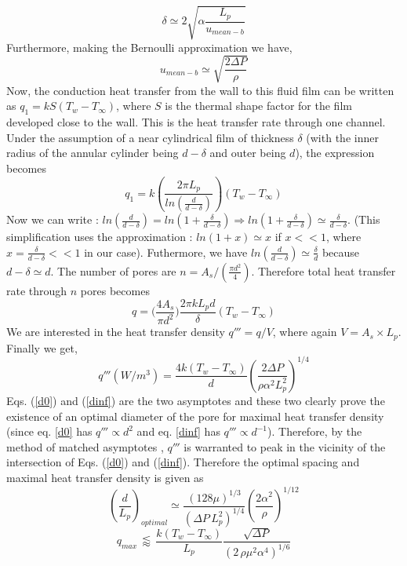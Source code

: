 \documentclass[twocolumn,10pt,cleanfoot]{ihmtc}
\begin{document}
\[\delta \simeq 2\sqrt{\alpha \frac{L_p}{u_{mean-b}}}\]
%
Furthermore, making the Bernoulli approximation we have,
\[u_{mean-b} \simeq \sqrt{\frac{2\Delta P}{\rho }}\]
%
Now, the conduction heat transfer from the wall to this fluid film can be written as $ q_1=k S (T_w-T_\infty)$, where $ S $ is the thermal shape factor for the film developed close to the wall. This is the heat transfer rate through one channel. Under the assumption of a near cylindrical film of thickness $\delta$ (with the inner radius of the annular cylinder being $d-\delta$ and outer being $d$), the expression becomes
\[q_1=k \left( \frac{2 \pi L_p}{ln\left(\frac{d}{d-\delta}\right)} \right) (T_w-T_\infty) \]
Now we can write : $ln(\frac{d}{d-\delta})=ln(1+\frac{\delta}{d-\delta}) \Rightarrow ln(1+\frac{\delta}{d-\delta}) \simeq \frac{\delta}{d-\delta}$. (This simplification uses the approximation : $ln(1+x) \simeq x$ if $x<<1$, where $x=\frac{\delta}{d-\delta}<<1$ in our case). Futhermore, we have $ln(\frac{d}{d-\delta})\simeq\frac{\delta}{d}$ because $d-\delta \simeq d$. The number of pores are $n=A_s/(\frac{\pi d^2}{4})$. Therefore total heat transfer rate through $n$ pores becomes
\[q=\biggl( \frac{4 A_s}{\pi d^2}\biggr) \frac{2 \pi k L_p d}{\delta}(T_w-T_\infty)\]
We are interested in the heat transfer density $q''' = q/V$, where again $V=A_s \times L_p$. Finally we get, 
%
\begin{equation}\label{dinf}
q'''(W/m^3)=\frac{4k (T_w-T_\infty)}{d}\left(\frac{2\Delta P}{\rho\alpha^{2}L_{p}^{2}}\right)^{1/4}
\end{equation}
%
Eqs. (\ref{d0}) and (\ref{dinf}) are the two asymptotes and these two clearly prove the existence of an optimal diameter of the pore for maximal heat transfer density (since eq. \ref{d0} has $q''' \propto d^2$ and eq. \ref{dinf} has $q''' \propto d^{-1}$). Therefore, by the method of matched asymptotes \cite{bejan2004declength}, $q'''$ is warranted to peak in the vicinity of the intersection of Eqs. (\ref{d0}) and (\ref{dinf}). Therefore the optimal spacing and maximal heat transfer density is given as 
%
\begin{equation}
\left(\frac{d}{L_{p}}\right)_{optimal} \simeq \frac{\left(128\mu\right)^{{1}/{3}}}{\left(\Delta P \, L_p^2 \right)^{{1}/{4}}}\left(\frac{2\alpha^{2}}{\rho}\right)^{{1}/{12}}
\end{equation}
%
\begin{equation}
q_{max}\,  \lessapprox \, \frac{k (T_w-T_\infty)}{L_p}\frac{\sqrt{\Delta P}}{(2\, \rho \mu^2 \alpha^4)^{1/6}}
\end{equation}
\end{document}
